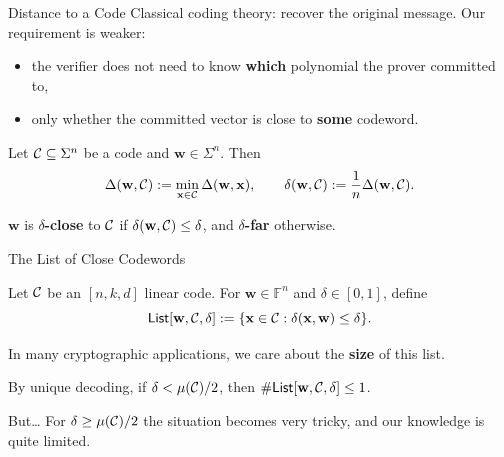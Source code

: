 \documentclass{zkdl-presentation-template}
\begin{document}
    \begin{frame}{Distance to a Code}
        Classical coding theory: recover the original message. Our requirement is weaker:
        \begin{itemize}
            \item the verifier does not need to know \textbf{which} polynomial the prover committed to,
            \item only whether the committed vector is close to \textbf{some} codeword.
        \end{itemize}
        \pause

        \begin{definition}
            Let $\mathcal{C} \subseteq \Sigma^n$ be a code and $\mathbf{w} \in \Sigma^n$. Then
            \begin{equation*}
                \Delta(\mathbf{w}, \mathcal{C}) := \min_{\mathbf{x} \in \mathcal{C}} \Delta(\mathbf{w}, \mathbf{x}), \qquad \delta(\mathbf{w}, \mathcal{C}) := \frac{1}{n}\Delta(\mathbf{w}, \mathcal{C}).
            \end{equation*}
        \end{definition}
        \pause

        $\mathbf{w}$ is \textbf{$\delta$-close} to $\mathcal{C}$ if $\delta(\mathbf{w}, \mathcal{C}) \leq \delta$, and \textbf{$\delta$-far} otherwise.
    \end{frame}

    \begin{frame}{The List of Close Codewords}
        \begin{definition}
            Let $\mathcal{C}$ be an $[n,k,d]$ linear code. For $\mathbf{w} \in \mathbb{F}^n$ and $\delta \in [0,1]$, define
            \begin{equation*}
                \mathsf{List}[\mathbf{w},\mathcal{C},\delta] := \{\mathbf{x} \in \mathcal{C}: \delta(\mathbf{x}, \mathbf{w}) \leq \delta\}.
            \end{equation*}
        \end{definition}
        \pause

        In many cryptographic applications, we care about the \textbf{size} of this list.
        \pause

        \begin{example}
            By unique decoding, if $\delta < \mu(\mathcal{C})/2$, then $\#\mathsf{List}[\mathbf{w},\mathcal{C},\delta] \leq 1$.
        \end{example}
        \pause

        \begin{alertblock}{But\ldots}
            For $\delta \geq \mu(\mathcal{C})/2$ the situation becomes very tricky, and our knowledge is quite limited.
        \end{alertblock}
    \end{frame}
\end{document}
